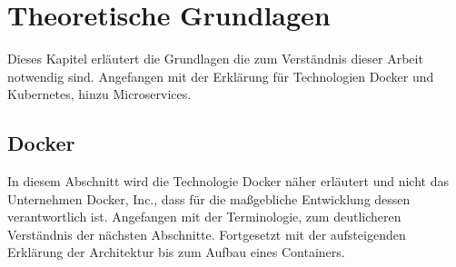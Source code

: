 \chapter{Theoretische Grundlagen}
Dieses Kapitel erläutert die Grundlagen die zum 
Verständnis dieser Arbeit notwendig sind. 
Angefangen mit der Erklärung für Technologien
Docker und Kubernetes, hinzu Microservices.


\section{Docker} \label{Docker}

In diesem Abschnitt wird die Technologie \glqq Docker\grqq{} näher erläutert und
nicht das Unternehmen \glqq Docker, Inc.\grqq{}, dass für die maßgebliche Entwicklung dessen verantwortlich ist.
Angefangen mit der Terminologie, zum deutlicheren Verständnis der nächsten Abschnitte.
Fortgesetzt mit der aufsteigenden Erklärung der Architektur bis zum Aufbau eines Containers.


